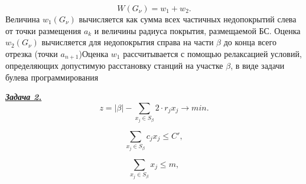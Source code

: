 



\begin{displaymath}
    W\left(G_\nu\right) = w_1 + w_2. 
\end{displaymath}
Величина $w_1 \left(G_\nu \right)$ вычисляется как сумма всех частичных недопокрытий слева от точки размещения $a_k$ и величины радиуса покрытия, размещаемой БС. Оценка $w_2 \left(G_\nu \right)$ вычисляется для недопокрытия справа на части $\beta$ до конца всего отрезка (точки $a_{n+1}$)Оценка $w_1$ рассчитывается с помощью релаксацией условий, определяющих допустимую расстановку станций на участке $\beta$, в виде задачи булева программирования


\underline{\textit{\textbf{Задача 2.}}}
\begin{displaymath}
    z = |\beta| - \sum\limits_{x_j \in S_\beta} 2 \cdot r_j x_j \rightarrow min.
\end{displaymath}

\begin{equation}\label{eq:part4_task2_cost}
    \sum\limits_{x_j \in S_\beta} c_j x_j \leqslant C',
\end{equation}

\begin{equation}\label{eq:part4_task2_m}
    \sum\limits_{x_j \in S_\beta} x_j \leqslant m,
\end{equation}

